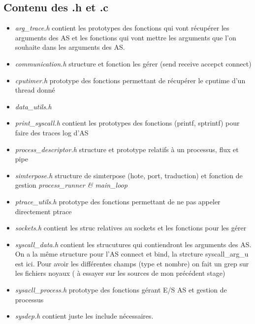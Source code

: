 \documentclass{article}
\begin{document}
\subsection{Contenu des .h et .c}
\begin{itemize}
\item \textit{{\color{brown}arg\_trace.h}} contient les prototypes des
  fonctions qui vont récupérer les arguments des AS et les fonctions
  qui vont mettre les arguments que l'on souhaite dans les arguments
  des AS.
\item \textit{communication.h} structure et fonction les gérer (send
  receive accepct connect)
\item \textit{cputimer.h} prototype des fonctions permettant de
  récupérer le cputime d'un thread donné
\item \textit{{\color{red} data\_utils.h}}
\item \textit{print\_syscall.h} contient les prototypes des fonctions
  (printf, sptrintf) pour faire des traces log d'AS
\item \textit{{\color{brown}process\_descriptor.h}} structure et
  prototype relatifs à un processus, flux et pipe
\item \textit{simterpose.h} structure de simterpose (hote, port,
  traduction) et fonction de gestion \textit{process\_runner \&
    main\_loop}
\item \textit{ptrace\_utils.h} prototype des fonctions permettant de
  ne pas appeler directement ptrace
\item \textit{sockets.h} contient les struc relatives au sockets et
  les fonctions pour les gérer
\item \textit{{\color{brown}syscall\_data.h}} contient les strucutures
  qui contiendront les arguments des AS. On a la même structure pour
  l'AS connect et bind, la strcture {\color{red} syscall\_arg\_u} est
  ici. Pour avoir les différentes champs (type et nombre) on fait un
  grep sur les fichiers noyaux ( {\color{red} à essayer sur les
    sources de mon précédent stage})
\item \textit{{\color{brown} sysacll\_process.h }} prototype des
  fonctions gérant E/S AS et gestion de processus
\item \textit{sysdep.h} contient juste les include nécessaires.
\end{itemize}
\end{document}
